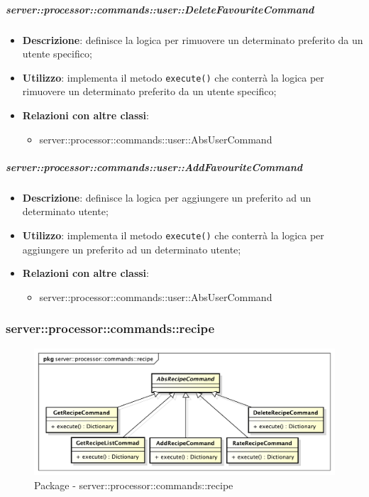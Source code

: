         \subparagraph{server::processor::commands::user::DeleteFavouriteCommand} %
        \label{subp:bdsm_app_server_processor_commands_user_deletefavouritecommand}
        \begin{itemize}
          \item \textbf{Descrizione}: definisce la logica per rimuovere un determinato preferito da un utente specifico;
          \item \textbf{Utilizzo}: implementa il metodo \texttt{execute()} che conterrà la logica per rimuovere un determinato preferito da un utente specifico;
          \item \textbf{Relazioni con altre classi}:
            \begin{itemize}
              \item server::processor::commands::user::AbsUserCommand
            \end{itemize}
        \end{itemize}

        \subparagraph{server::processor::commands::user::AddFavouriteCommand} %
        \label{subp:bdsm_app_server_processor_commands_user_addfavouritecommand}
        \begin{itemize}
          \item \textbf{Descrizione}: definisce la logica per aggiungere un preferito ad un determinato utente;
          \item \textbf{Utilizzo}: implementa il metodo \texttt{execute()} che conterrà la logica per aggiungere un preferito ad un determinato utente;
          \item \textbf{Relazioni con altre classi}:
            \begin{itemize}
              \item server::processor::commands::user::AbsUserCommand
            \end{itemize}
        \end{itemize}


      \subsubsection{server::processor::commands::recipe} %
      \label{ssub:bdsm_app_server_processor_commands_recipe}
      \begin{figure}[!htbp]
      	\centering
      	\centerline{\includegraphics[scale=0.5]{./images/server/recipe.pdf}}
      	\caption{Package - server::processor::commands::recipe}
      \end{figure}


